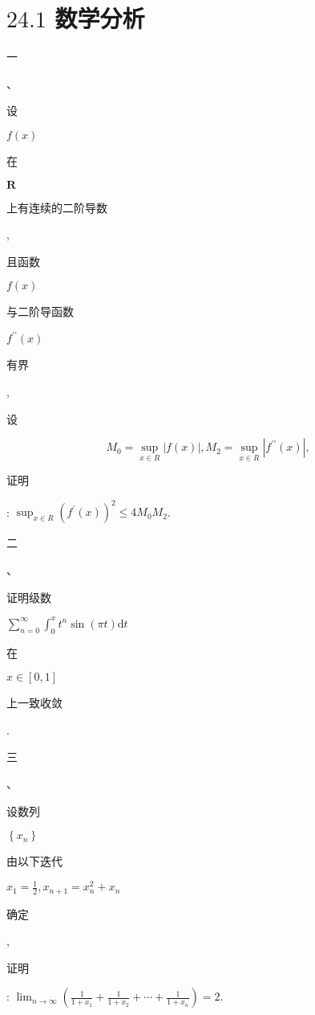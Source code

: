 \documentclass[10pt]{article}
\begin{document}
\section{$24.1$ 数学分析}
\begin{CJK}{UTF8}{mj}一\end{CJK}、\begin{CJK}{UTF8}{mj}设\end{CJK} $f(x)$ \begin{CJK}{UTF8}{mj}在\end{CJK} $\mathbf{R}$ \begin{CJK}{UTF8}{mj}上有连续的二阶导数\end{CJK}, \begin{CJK}{UTF8}{mj}且函数\end{CJK} $f(x)$ \begin{CJK}{UTF8}{mj}与二阶导函数\end{CJK} $f^{\prime \prime}(x)$ \begin{CJK}{UTF8}{mj}有界\end{CJK}, \begin{CJK}{UTF8}{mj}设\end{CJK}
$$
M_{0}=\sup _{x \in R}|f(x)|, M_{2}=\sup _{x \in R}\left|f^{\prime \prime}(x)\right|,
$$
\begin{CJK}{UTF8}{mj}证明\end{CJK}: $\sup _{x \in R}\left(f^{\prime}(x)\right)^{2} \leqslant 4 M_{0} M_{2}$.

\begin{CJK}{UTF8}{mj}二\end{CJK}、\begin{CJK}{UTF8}{mj}证明级数\end{CJK} $\sum_{n=0}^{\infty} \int_{0}^{x} t^{n} \sin (\pi t) \mathrm{d} t$ \begin{CJK}{UTF8}{mj}在\end{CJK} $x \in[0,1]$ \begin{CJK}{UTF8}{mj}上一致收敛\end{CJK}.

\begin{CJK}{UTF8}{mj}三\end{CJK}、\begin{CJK}{UTF8}{mj}设数列\end{CJK} $\left\{x_{n}\right\}$ \begin{CJK}{UTF8}{mj}由以下迭代\end{CJK} $x_{1}=\frac{1}{2}, x_{n+1}=x_{n}^{2}+x_{n}$ \begin{CJK}{UTF8}{mj}确定\end{CJK}, \begin{CJK}{UTF8}{mj}证明\end{CJK}: $\lim _{n \rightarrow \infty}\left(\frac{1}{1+x_{1}}+\frac{1}{1+x_{2}}+\cdots+\frac{1}{1+x_{n}}\right)=2$.
\end{document}

